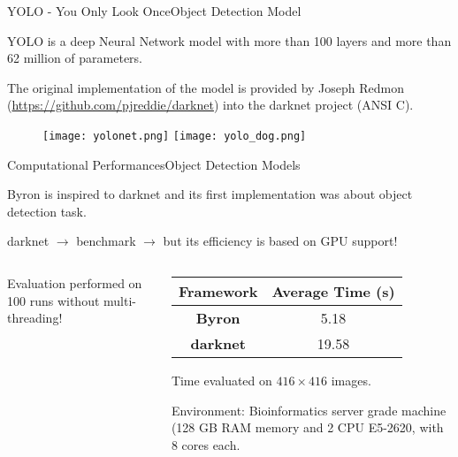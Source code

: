 \documentclass[10pt, technote, oribibl, unicode]{beamer}
\begin{document}
\begin{frame}{YOLO - You Only Look Once}{Object Detection Model}

  \scriptsize{YOLO is a deep Neural Network model with more than 100 layers and more than 62 million of parameters.}

  \scriptsize{The original implementation of the model is provided by Joseph Redmon (\url{https://github.com/pjreddie/darknet}) into the \textsf{darknet} project (\textsf{ANSI C}).}

  \begin{figure}
    \begin{overprint}
      \centering\texttt{[image: yolonet.png]}
      \centering\texttt{[image: yolo\_dog.png]}
    \end{overprint}
  \end{figure}

\end{frame}


\begin{frame}{Computational Performances}{Object Detection Models}

  \scriptsize{\textsf{Byron} is inspired to \textsf{darknet} and its first implementation was about object detection task.}

  \scriptsize{\textsf{darknet} $\rightarrow$ benchmark $\rightarrow$ but its efficiency is based on GPU support!}

  \vfill
  \begin{columns}
    \begin{column}{0.6\textwidth}
      \scriptsize{Evaluation performed on 100 runs without multi-threading!}

      \def\svgwidth{\linewidth}
    \end{column}
    \begin{column}{0.4\textwidth}
      \scriptsize{
      \begin{tabular}{cc}
        \hline \rowcolor{NormalBlue}
        \textbf{Framework} & \textbf{Average Time (s)} \\
        \hline
        \textbf{Byron}     & 5.18                      \\
        \textbf{darknet}   & 19.58                     \\
        \hline
      \end{tabular}
      }

      \vspace{0.5cm}
      \scriptsize{Time evaluated on $416\times 416$ images.}

      \scriptsize{Environment: Bioinformatics server grade machine (128 GB RAM memory and 2 CPU E5-2620, with 8 cores each.}
    \end{column}
  \end{columns}

\end{frame}
\end{document}
